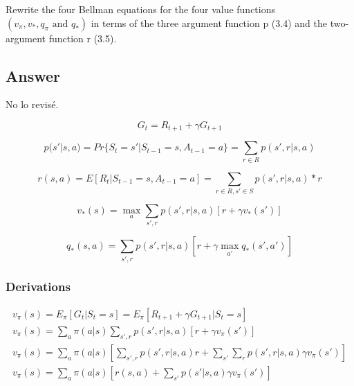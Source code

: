 \documentclass[11pt]{article}
\def\red{\color{red}}
\begin{document}
    Rewrite the four Bellman equations for the four value functions $ (v_\pi ,v_* , q_\pi \text{ and } q_* ) $ in terms of the three argument function p (3.4) and the two-argument function r (3.5).

    \subsection*{Answer}
    {\red No lo revisé.}

    \begin{equation}
        G_t = R_{t+1} + \gamma G_{t+1}
    \end{equation}

    \begin{equation}
        p(s'|s,a) = Pr\{S_t=s'|S_{t-1}=s, A_{t-1}=a\} = \sum_{r \in R} p(s', r | s, a)
    \end{equation}

    \begin{equation}
        r(s,a) = E [R_t |S_{t-1}=s, A_{t-1}=a ] = \sum_{r \in R, s' \in S} p(s', r | s, a) * r
    \end{equation}

    \begin{equation}
        v_*(s) = \max_{a} \sum_{s',r} p(s',r| s, a) [r+\gamma v_*(s')]
    \end{equation}

     \begin{equation}
        q_*(s, a) = \sum_{s',r} p(s',r| s, a) [r+\gamma \max_{a'} q_*(s',a')]
    \end{equation}

    \subsubsection*{Derivations}

    \begin{equation}
        \begin{split}
            v_{\pi} (s) = E_{\pi} [G_t | S_t = s] = E_{\pi} [ R_{t+1} + \gamma G_{t+1} | S_t = s] \\
            v_{\pi} (s) = \sum_{a} \pi(a|s) \sum_{s',r} p(s',r|s,a) [r+\gamma v_\pi(s')] \\
            v_{\pi} (s) = \sum_{a} \pi(a|s) [\sum_{s',r} p(s',r|s,a) r + \sum_{s'}\sum_{r} p(s',r|s,a) \gamma v_\pi(s')] \\
            v_{\pi} (s) = \sum_{a} \pi(a|s) [r(s,a) + \sum_{s'} p(s'|s,a) \gamma v_\pi(s')] \\
        \end{split}
    \end{equation}
\end{document}
